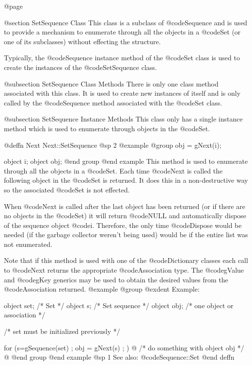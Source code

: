 @page

@section SetSequence Class
This class is a subclass of @code{Sequence} and is used to provide a
mechanism to enumerate through all the objects in a @code{Set} (or one
of its subclasses) without effecting the structure.

Typically, the @code{Sequence} instance method of the @code{Set} class
is used to create the instances of the @code{SetSequence} class.  



@subsection SetSequence Class Methods
There is only one class method associated with this class.  It is used
to create new instances of itself and is only called by the @code{Sequence}
method associated with the @code{Set} class.

@subsection SetSequence Instance Methods
This class only has a single instance method which is used to enumerate
through objects in the @code{Set}.






@deffn {Next} Next::SetSequence
@sp 2
@example
@group
obj = gNext(i);

object  i;
object  obj;
@end group
@end example
This method is used to enumerate through all the objects in a @code{Set}.
Each time @code{Next} is called the following object in the @code{Set}
is returned.  It does this in a non-destructive way so the associated
@code{Set} is not effected.

When @code{Next} is called after the last object has been returned (or
if there are no objects in the @code{Set}) it will return @code{NULL} and
automatically dispose of the sequence object @code{i}.  Therefore,
the only time @code{Dispose} would be needed (if the garbage collector
weren't being used) would be if the entire list was not enumerated.

Note that if this method is used with one of the @code{Dictionary} classes
each call to @code{Next} returns the appropriate @code{Association} type.
The @code{gValue} and @code{gKey} generics may be used to obtain
the desired values from the @code{Association} returned.
@example
@group
@exdent Example:

object  set;  /*  Set                        */
object  s;    /*  Set sequence               */
object  obj;  /*  one object or association  */

/*  set must be initialized previously  */

for (s=gSequence(set) ; obj = gNext(s) ; )  @{
        /*  do something with object obj  */
@}
@end group
@end example
@sp 1
See also:  @code{Sequence::Set}
@end deffn



